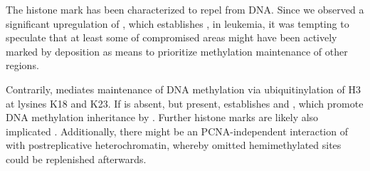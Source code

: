 
The histone mark \histwoarg has been characterized to repel  from DNA\cite{Veland2017}. Since we observed a significant upregulation of , which establishes \histwoarg, in \dnmtchip \mllafnine leukemia, it was tempting to speculate that at least some of compromised areas might have been actively marked by \histwoarg deposition as means to prioritize methylation maintenance of other regions.

Contrarily,  mediates maintenance of DNA methylation via ubiquitinylation of H3 at lysines K18 and K23\cite{Harrison2016}. If \histwoarg is absent, but \hisninethree present,  establishes \hiseighteenub and \histwentythreeub, which promote DNA methylation inheritance by \cite{DaRosa2018, Li2018a}. Further histone marks are likely also implicated . Additionally, there might be an PCNA-independent interaction of  with postreplicative heterochromatin\cite{Schneider2013}, whereby omitted hemimethylated sites could be replenished afterwards.